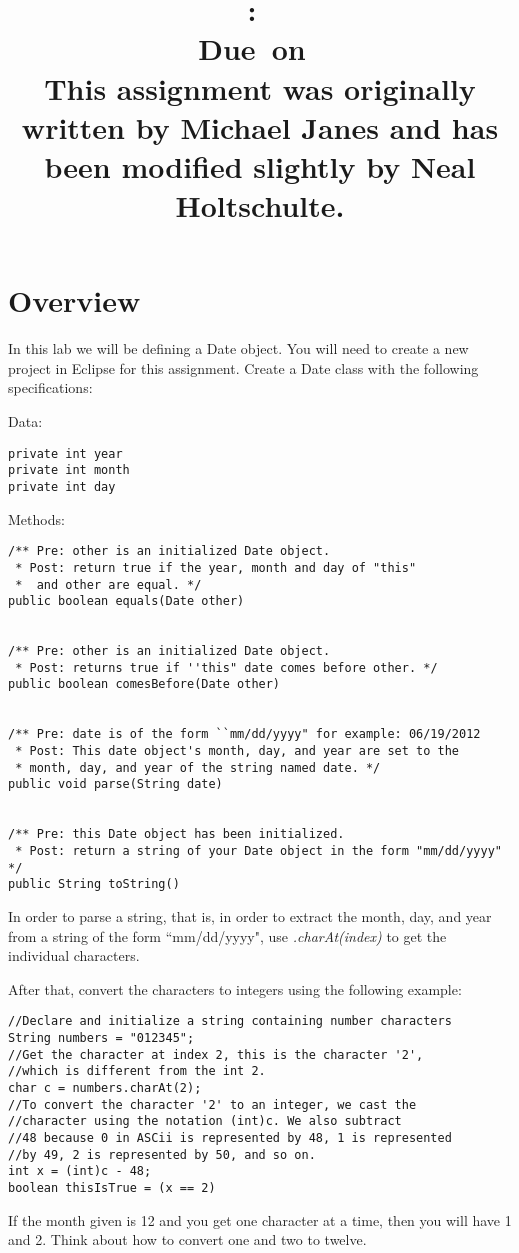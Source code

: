 \documentclass{article}
\title{
\textmd{\textbf{\hmwkClass:\ \hmwkTitle}}\\
\large{Due\ on\ \hmwkDueDate}\\
\vspace{0.2cm}
This assignment was originally written by Michael Janes and has been modified slightly by Neal Holtschulte.
}
\date{} %
\begin{document}
\maketitle


\section*{Overview}

In this lab we will be defining a Date object. You will need to create a new project in Eclipse for this assignment. Create a Date class with the following specifications:

Data:

\begin{lstlisting}
private int year
private int month
private int day
\end{lstlisting}

Methods:

\begin{lstlisting}
/** Pre: other is an initialized Date object.
 * Post: return true if the year, month and day of "this"
 *  and other are equal. */
public boolean equals(Date other)


/** Pre: other is an initialized Date object.
 * Post: returns true if ''this" date comes before other. */
public boolean comesBefore(Date other)


/** Pre: date is of the form ``mm/dd/yyyy" for example: 06/19/2012
 * Post: This date object's month, day, and year are set to the 
 * month, day, and year of the string named date. */
public void parse(String date)


/** Pre: this Date object has been initialized.
 * Post: return a string of your Date object in the form "mm/dd/yyyy" */
public String toString()
\end{lstlisting}

In order to parse a string, that is, in order to extract the month, day, and year from a string of the form ``mm/dd/yyyy", use \emph{.charAt(index)} to get the individual characters.

\vspace{3cm}

After that, convert the characters to integers using the following example:
\begin{lstlisting}
//Declare and initialize a string containing number characters
String numbers = "012345";
//Get the character at index 2, this is the character '2', 
//which is different from the int 2. 
char c = numbers.charAt(2);
//To convert the character '2' to an integer, we cast the
//character using the notation (int)c. We also subtract
//48 because 0 in ASCii is represented by 48, 1 is represented
//by 49, 2 is represented by 50, and so on.
int x = (int)c - 48;
boolean thisIsTrue = (x == 2)
\end{lstlisting}
If the month given is 12 and you get one character at a time, then you will have 1 and 2. Think about how to convert one and two to twelve.\\
\end{document}
